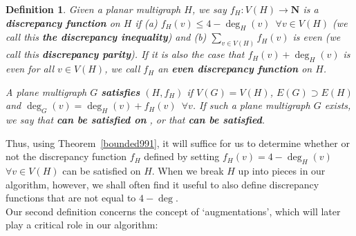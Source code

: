 \documentclass{article}
\newtheorem{Proof of Theorem}{Proof of Theorem}
\newtheorem{Definition}[Theorem]{Definition}
\begin{document}
\begin{Definition}
Given a planar multigraph $H$,
we say
$f_{H}:V(H) \to \mathbf{N}$
is a \emph{\textbf{discrepancy function}} on $H$
if (a) $f_{H}(v) \leq 4-\deg_{H}(v)$~$\forall v \in V(H)$
(we call this \emph{\textbf{the discrepancy inequality}})
and (b) $\sum_{v \in V(H)} f_{H}(v)$ is even
(we call this \emph{\textbf{discrepancy parity}}).
If it is also the case that $f_{H}(v) + \deg_{H}(v)$ is even for all $v \in V(H)$,
we call $f_{H}$ an \emph{\textbf{even discrepancy function}} on $H$.

A plane multigraph $G$ \emph{\textbf{satisfies}} $(H,f_{H})$
if $V(G)=V(H)$, $E(G) \supset E(H)$ and $\deg_{G}(v) = \deg_{H}(v) + f_{H}(v)$~$\forall v$.
If such a plane multigraph $G$ exists,
we say that \emph{} \emph{\textbf{can be satisfied on}} \emph{},
or that \emph{\textbf{ can be satisfied}}.
\end{Definition} 















Thus, using Theorem~\ref{bounded991},
it will suffice for us to determine whether or not
the discrepancy function $f_{H}$ defined by setting $f_{H}(v) = 4-\deg_{H}(v)$~$\forall v \in V(H)$
can be satisfied on $H$.
When we break $H$ up into pieces in our algorithm, however,
we shall often find it useful to also define discrepancy functions that are not equal to $4 - \deg$. \\















Our second definition concerns the concept of `augmentations',
which will later play a critical role in our algorithm:
\end{document}
